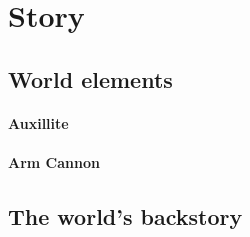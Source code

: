 \documentclass[../Main.tex]{subfiles}
\begin{document}
\section{Story}


\subsection{World elements}

\paragraph{Auxillite} 

\paragraph{Arm Cannon}

\subsection{The world's backstory}
\end{document}
